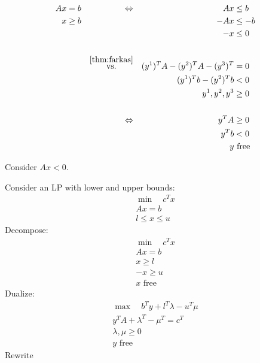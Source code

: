 \begin{align*}
    Ax & = b    & \Leftrightarrow                        &  & Ax                            & \leq b       \\
    x  & \geq b &                                        &  & -Ax                           & \leq -b      \\
       &        &                                        &  & -x                            & \leq 0       \\
    \\
       &        & \overset{\ref{thm:farkas}}{\text{vs.}} &  & (y^1)^TA - (y^2)^TA - (y^3)^T & = 0          \\
       &        &                                        &  & (y^1)^Tb - (y^2)^Tb           & <0           \\
       &        &                                        &  & y^1,y^2,y^3                   & \geq 0       \\
    \\
       &        & \Leftrightarrow                        &  & y^TA                          & \geq 0       \\
       &        &                                        &  & y^Tb                          & < 0          \\
       &        &                                        &  & y                             & \text{ free} \\
\end{align*}
\begin{theorem}[Gourdan]
    Consider $Ax < 0$.
\end{theorem}
Consider an LP with lower and upper bounds:
\begin{align*}
    \min \quad c^Tx \\
    Ax=b            \\
    l \leq x \leq u
\end{align*}
Decompose:
\begin{align*}
    \min \quad c^Tx \\
    Ax=b            \\
    x \geq l        \\
    -x \geq u       \\
    x \text{ free}
\end{align*}
Dualize:
\begin{align*}
    \max \quad b^Ty + l^T\lambda - u^T \mu \\
    y^TA + \lambda^T - \mu^T = c^T         \\
    \lambda,\mu \geq 0                     \\
    y \text{ free}
\end{align*}
Rewrite